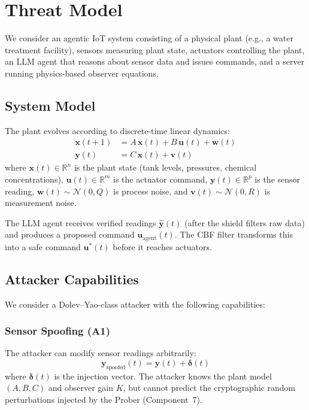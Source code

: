 \documentclass[journal]{IEEEtran}
\newcommand{\R}{\mathbb{R}}
\begin{document}
\section{Threat Model}
\label{sec:threat_model}

We consider an agentic IoT system consisting of a physical plant (e.g., a water treatment facility), sensors measuring plant state, actuators controlling the plant, an LLM agent that reasons about sensor data and issues commands, and a server running physics-based observer equations.

\subsection{System Model}

The plant evolves according to discrete-time linear dynamics:
\begin{align}
  \bm{x}(t+1) &= A\,\bm{x}(t) + B\,\bm{u}(t) + \bm{w}(t) \label{eq:state}\\
  \bm{y}(t) &= C\,\bm{x}(t) + \bm{v}(t) \label{eq:observation}
\end{align}
where $\bm{x}(t) \in \R^n$ is the plant state (tank levels, pressures, chemical concentrations), $\bm{u}(t) \in \R^m$ is the actuator command, $\bm{y}(t) \in \R^p$ is the sensor reading, $\bm{w}(t) \sim \mathcal{N}(0, Q)$ is process noise, and $\bm{v}(t) \sim \mathcal{N}(0, R)$ is measurement noise.

The LLM agent receives verified readings $\hat{\bm{y}}(t)$ (after the shield filters raw data) and produces a proposed command $\bm{u}_{\text{agent}}(t)$. The CBF filter transforms this into a safe command $\bm{u}^*(t)$ before it reaches actuators.

\subsection{Attacker Capabilities}

We consider a Dolev--Yao-class attacker with the following capabilities:

\subsubsection{Sensor Spoofing (A1)}
The attacker can modify sensor readings arbitrarily:
\begin{equation}
  \bm{y}_{\text{spoofed}}(t) = \bm{y}(t) + \bm{\delta}(t)
  \label{eq:spoofing}
\end{equation}
where $\bm{\delta}(t)$ is the injection vector. The attacker knows the plant model $(A, B, C)$ and observer gain $K$, but cannot predict the cryptographic random perturbations injected by the Prober (Component~7).
\end{document}
